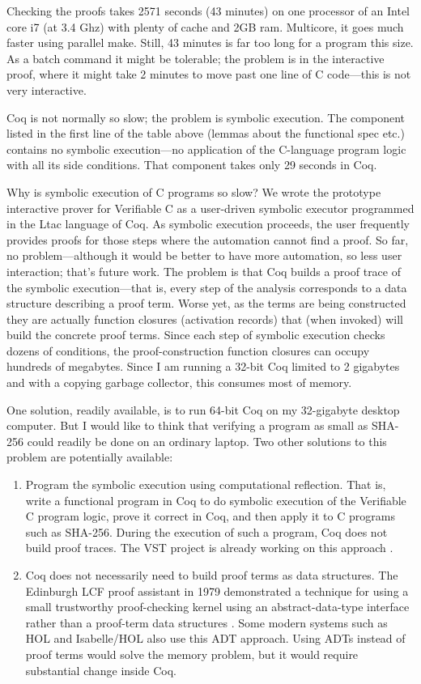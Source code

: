 \documentclass[prodmode,acmtoplas]{acmsmall}
\begin{document}
Checking the proofs takes 2571 seconds (43 minutes)
on one processor of an Intel core i7 (at 3.4 Ghz) with plenty of
cache and 2GB ram.  Multicore, it goes much faster
using parallel make.  Still, 43 minutes is far too long
for a program this size.  As a batch command it might
be tolerable; the problem is in the interactive proof,
where it might take 2 minutes to move past one
line of C code---this is not very interactive.

Coq is not normally so slow; the problem is
symbolic execution.  The component listed in the
first line of the table above (lemmas about the
functional spec etc.) contains no
symbolic execution---no application of the
C-language program logic with all its side conditions.
That component takes only 29 seconds in Coq.

Why is symbolic execution of C programs so slow?
We wrote the prototype interactive prover for Verifiable C
as a user-driven symbolic executor programmed in the
Ltac language of Coq.  As symbolic execution proceeds,
the user frequently provides proofs for those steps
where the automation cannot find a proof.  
So far, no problem---although it would be better
to have more automation, so less user interaction; that's
future work.  The problem is that Coq builds
a proof trace of the symbolic execution---that is,
every step of the analysis corresponds to a data structure
describing a proof term.  Worse yet, as the terms
are being constructed they are actually function
closures (activation records) that (when invoked)
will build the concrete proof terms.
Since each step of symbolic execution
checks dozens of conditions, the proof-construction
function closures can occupy hundreds of megabytes.
Since I am running a 32-bit Coq limited to 2 gigabytes
and with a copying garbage collector, this consumes
most of memory.

One solution, readily available, is to run 64-bit Coq
on my 32-gigabyte desktop computer.  But I would
like to think that verifying a program as small
as SHA-256 could readily be done on an ordinary laptop.
Two other solutions to this problem are potentially
available:
\begin{enumerate}
\item Program the symbolic execution using computational
reflection.  That is, write a functional program in Coq
to do symbolic execution of the Verifiable C program logic,
prove it correct in Coq, and then apply it to C programs
such as SHA-256.  During the execution of such a program,
Coq does not build proof traces.  
The VST project is already
working on this approach \cite[Chapters 25,46,47]{appel14:plcc}.
\item Coq does not necessarily need to build proof terms
as data structures.  The Edinburgh LCF proof assistant
in 1979 demonstrated a technique for using a
small trustworthy proof-checking kernel using an
abstract-data-type interface rather than
a proof-term data structures \cite{gordon79}.
Some modern systems such as HOL and Isabelle/HOL also use this
ADT approach.
Using ADTs instead of proof terms
would solve the memory problem,
but it would require substantial change inside Coq.
\end{enumerate}
\end{document}
